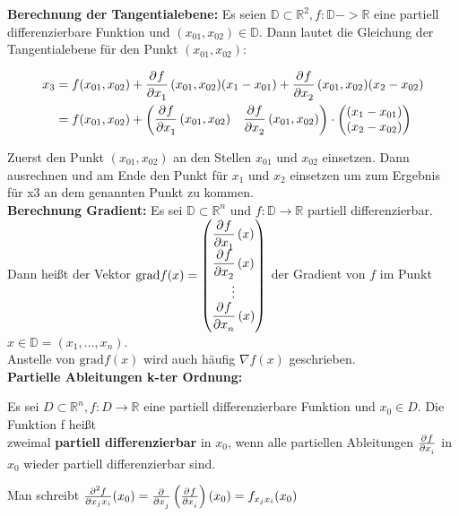 \documentclass[fontset=ubuntu,12pt,a4paper,fleqn]{article}
\begin{document}
\textbf{Berechnung der Tangentialebene:}
Es seien \(\mathbb{D} \subset \mathbb{R}^2, f:\mathbb{D}->\mathbb{R}\) eine partiell differenzierbare Funktion und \((x_{01},x_{02})\in\mathbb{D}\). Dann lautet die Gleichung der Tangentialebene für den Punkt \((x_{01},x_{02})\):

\begin{align*}
x_3&=f(x_{01},x_{02})+\dpd{f}{x_1}(x_{01},x_{02})(x_1-x_{01})+\dpd{f}{x_2}(x_{01},x_{02})(x_2-x_{02})\\
&=f(x_{01},x_{02})+\begin{pmatrix} \dpd{f}{x_1} (x_{01},x_{02}) & \dpd{f}{x_2}(x_{01},x_{02}) \end{pmatrix} \cdot \begin{pmatrix} (x_1-x_{01})\\ (x_2-x_{02}) \end{pmatrix}
\end{align*}

Zuerst den Punkt $(x_{01},x_{02})$ an den Stellen $x_{01}$ und $x_{02}$ einsetzen. Dann ausrechnen und am Ende den Punkt für  $x_{1}$ und $x_{2}$ einsetzen um zum Ergebnis für x3 an dem genannten Punkt zu kommen.\\

\textbf{Berechnung Gradient:}
Es sei \(\mathbb{D} \subset \mathbb{R}^n\) und \(f:\mathbb{D} \to \mathbb{R}\) partiell differenzierbar. Dann heißt der Vektor \(\mathrm{grad} f(x) = \begin{pmatrix}
\dpd{f}{x_1}(x) \\
\dpd{f}{x_2}(x) \\
\vdots \\
\dpd{f}{x_n}(x) \\
\end{pmatrix}\) der Gradient von \(f\) im Punkt \(x\in\mathbb{D}= (x_1,\dots,x_n)\).\\Anstelle von \(\mathrm{grad} f(x)\) wird auch häufig \(\nabla f(x)\) geschrieben.\\

\textbf{Partielle Ableitungen k-ter Ordnung:}

Es sei \(D\subset\mathbb{R}^n,f:D\to\mathbb{R}\) eine partiell differenzierbare Funktion und \(x_0 \in D\). Die Funktion f heißt \\ zweimal \textbf{partiell differenzierbar} in \(x_0\), wenn alle partiellen Ableitungen \(\pd{f}{x_i}\) in \(x_0\) wieder partiell differenzierbar sind.

Man schreibt \(\frac{\partial^2 f}{\partial x_j x_i}(x_0)=\pd{}{x_j}\left(\pd{f}{x_i}\right)(x_0)=f_{x_j x_i}(x_0)\)
\end{document}
